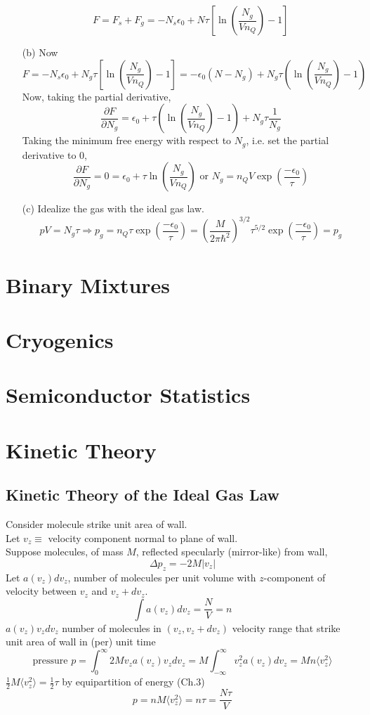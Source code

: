 \documentclass[twoside]{amsart}
\theoremstyle{plain}
\theoremstyle{definition}
\begin{document}
\begin{enumerate}
\[
\boxed{ F = F_s + F_g = -N_s \epsilon_0 + N\tau \left[ \ln{ \left( \frac{N_g}{Vn_Q} \right) } - 1 \right] }
\]
\item[(b)] Now
\[
F = -N_s \epsilon_0 + N_g \tau [ \ln{ \left( \frac{N_g}{Vn_Q} \right)} -1 ] = -\epsilon_0 (N-N_g) + N_g \tau \left( \ln{ \left( \frac{N_g}{Vn_Q} \right) - 1 } \right)
\]
Now, taking the partial derivative,
\[
\frac{ \partial F}{ \partial N_g} = \epsilon_0 + \tau \left( \ln{ \left( \frac{N_g}{Vn_Q} \right) }-1 \right) + N_g \tau \frac{1}{N_g}
\]
Taking the minimum free energy with respect to $N_g$, i.e. set the partial derivative to $0$,
\[
\frac{ \partial F}{ \partial N_g } = 0 = \epsilon_0 + \tau \ln{\left( \frac{N_g}{Vn_Q} \right) } \text{ or } \boxed{ N_g = n_Q V \exp{ \left( \frac{-\epsilon_0}{\tau} \right) } }
\]
\item[(c)] Idealize the gas with the ideal gas law.  
\[
pV = N_g \tau \Longrightarrow p_g = n_Q \tau \exp{ \left( \frac{-\epsilon_0}{\tau} \right) } = \boxed{ \left( \frac{M}{2\pi \hbar^2 } \right)^{3/2} \tau^{5/2} \exp{ \left( \frac{-\epsilon_0}{\tau} \right) } = p_g }
\]
\end{enumerate}



\section{Binary Mixtures}

\section{Cryogenics}

\section{Semiconductor Statistics}

\section{Kinetic Theory}

\subsection*{Kinetic Theory of the Ideal Gas Law}

Consider molecule strike unit area of wall. \\
Let $v_z \equiv $ velocity component normal to plane of wall. \\
Suppose molecules, of mass $M$, reflected specularly (mirror-like) from wall,
\[
\Delta p_z = -2M|v_z|
\]
Let $a(v_z)dv_z$, number of molecules per unit volume with $z$-component of velocity between $v_z$ and $v_z + dv_z$.  
\[
\int a(v_z)dv_z = \frac{N}{V} = n
\]
$a(v_z) v_z dv_z$ number of molecules in $(v_z, v_z + dv_z)$  velocity range that strike unit area of wall in (per) unit time
\[
\text{pressure } p = \int_0^{\infty}2M v_za(v_z)v_z dv_z = M\int_{-\infty}^{\infty}v_z^2 a(v_z) dv_z = Mn\langle v_z^2 \rangle
\]
$\frac{1}{2}M\langle v_z^2 \rangle = \frac{1}{2} \tau$ by equipartition of energy (Ch.3)
\[
p = nM \langle v_z^2 \rangle = n\tau = \frac{N\tau}{V}
\]
\end{document}

